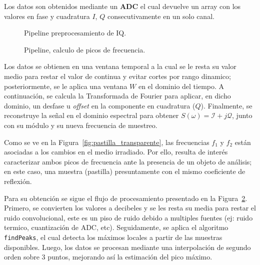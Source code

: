 Los datos son obtenidos mediante un \textbf{ADC} el cual devuelve un array con los valores en fase y cuadratura $I$, $Q$ consecutivamente en un solo canal.



\begin{figure}[H]
    \centering
    \resizebox{1.0\textwidth}{!}{%
    }
    \caption{Pipeline preprocesamiento de IQ.}
    \label{fig:freq_iq}
\end{figure}


\begin{figure}[H]
    \centering
    \resizebox{1.0\textwidth}{!}{%
    }
    \caption{Pipeline, calculo de picos de frecuencia.}
    \label{fig:calc_peaks}
\end{figure}



Los datos se obtienen en una ventana temporal a la cual se le resta su valor medio para restar el valor de continua y evitar cortes por rango dinamico; posteriormente, se le aplica una ventana $W$ en el dominio del tiempo.
A continuación, se calcula la Transformada de Fourier para aplicar, en dicho dominio, un desfase u \textit{offset} en la componente en cuadratura ($Q$).
Finalmente, se reconstruye la señal en el dominio espectral para obtener $S(\omega) = \mathcal{I} + j\mathcal{Q}$, junto con su módulo y su nueva frecuencia de muestreo.

Como se ve en la Figura~\ref{fig:pastilla_transparente}, las frecuencias $f_1$ y $f_2$ están asociadas a los cambios en el medio irradiado. Por ello, resulta de interés caracterizar ambos picos de frecuencia ante la presencia de un objeto de análisis; en este caso, una muestra (pastilla) presuntamente con el mismo coeficiente de reflexión.

Para su obtención se sigue el flujo de procesamiento presentado en la Figura~\ref{fig:calc_peaks}. Primero, se convierten los valores a decibeles y se les resta su media para restar el ruido convolucional, este  es un piso de ruido debido a multiples fuentes (ej: ruido termico, cuantización de ADC, etc).
Seguidamente, se aplica el algoritmo \texttt{findPeaks}, el cual detecta los máximos locales a partir de las muestras disponibles. Luego, los datos se procesan mediante una interpolación de segundo orden sobre 3 puntos, mejorando así la estimación del pico máximo.

